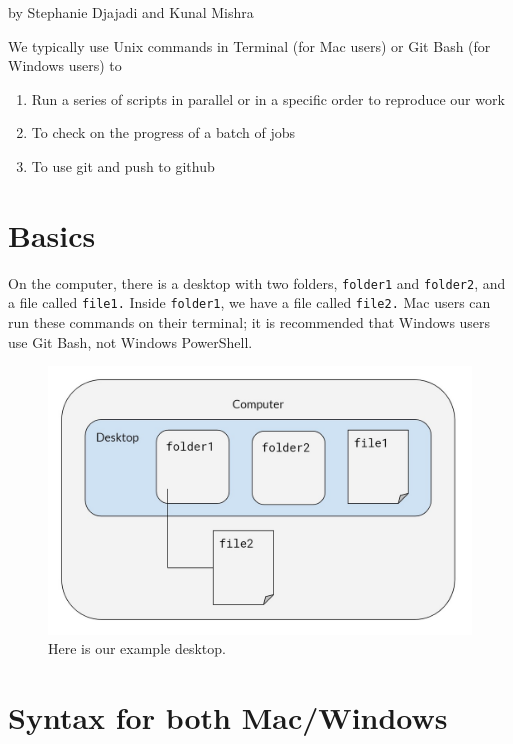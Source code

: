 \documentclass[]{book}
\providecommand{\tightlist}{%
  \setlength{\itemsep}{0pt}\setlength{\parskip}{0pt}}
\begin{document}
by Stephanie Djajadi and Kunal Mishra

We typically use Unix commands in Terminal (for Mac users) or Git Bash (for Windows users) to

\begin{enumerate}
\def\labelenumi{\arabic{enumi}.}
\tightlist
\item
  Run a series of scripts in parallel or in a specific order to reproduce our work
\item
  To check on the progress of a batch of jobs
\item
  To use git and push to github
\end{enumerate}

\hypertarget{basics-1}{%
\section{Basics}\label{basics-1}}

On the computer, there is a desktop with two folders, \texttt{folder1} and \texttt{folder2}, and a file called \texttt{file1.} Inside \texttt{folder1}, we have a file called \texttt{file2.} Mac users can run these commands on their terminal; it is recommended that Windows users use Git Bash, not Windows PowerShell.

\begin{figure}
\centering
\includegraphics{assets/images/ex-desktop.jpg}
\caption{Here is our example desktop.}
\end{figure}

\hypertarget{syntax-for-both-macwindows}{%
\section{Syntax for both Mac/Windows}\label{syntax-for-both-macwindows}}
\end{document}
